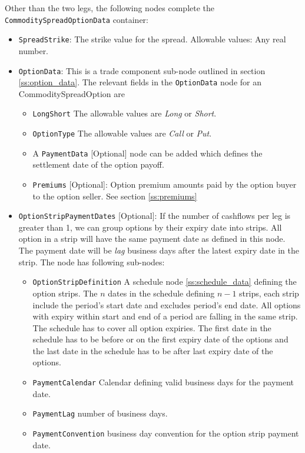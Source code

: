 Other than the two legs, the following nodes complete the \lstinline!CommoditySpreadOptionData! container:
\begin{itemize}
    \item \lstinline!SpreadStrike!: The strike value for the spread. Allowable values: Any real number.
    \item \lstinline!OptionData!: This is a trade component sub-node outlined in section \ref{ss:option_data}. 
The relevant fields in the \lstinline!OptionData! node for an CommoditySpreadOption are
	\begin{itemize}
		\item \lstinline!LongShort! The allowable values are \emph{Long} or \emph{Short}.

		\item \lstinline!OptionType! The allowable values are \emph{Call} or \emph{Put}. 

		\item A \lstinline!PaymentData! [Optional] node can be added which defines the settlement date of the option payoff.

		\item \lstinline!Premiums! [Optional]: Option premium amounts paid by the option buyer to the option seller. See section \ref{ss:premiums}
	\end{itemize}
	\item \lstinline!OptionStripPaymentDates! [Optional]: If the number of cashflows per leg is greater than 1, we can group options by their expiry date into strips. All option in a strip will have the same payment date as defined in this node. The payment date will be \emph{lag} business days after the latest expiry date in the strip. The node has following sub-nodes:
	\begin{itemize}
	\item \lstinline!OptionStripDefinition! A schedule node \ref{ss:schedule_data} defining the option strips. The $n$ dates in the schedule defining $n-1$ strips, each strip include the period's start date and excludes period's end date. All options with expiry within start and end of a period are falling in the same strip. The schedule has to cover all option expiries. The first date in the schedule has to be before or on the first expiry date of the options and the last date in the schedule has to be after last expiry date of the options. 
	\item \lstinline!PaymentCalendar! Calendar defining valid business days for the payment date.
	\item \lstinline!PaymentLag! number of business days.
	\item \lstinline!PaymentConvention! business day convention for the option strip payment date.
	\end{itemize}
\end{itemize}

